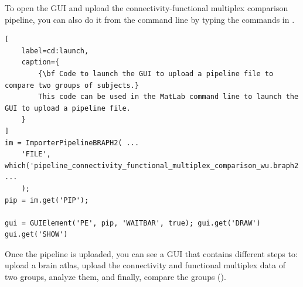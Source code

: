 \documentclass[justified]{tufte-handout}
\begin{document}
\begin{tcolorbox}[
	title=Pipeline launch from command line
]
To open the GUI and upload the connectivity-functional multiplex comparison pipeline, you can also do it from the command line by typing the commands in .
%
\begin{lstlisting}[
	label=cd:launch,
	caption={
		{\bf Code to launch the GUI to upload a pipeline file to compare two groups of subjects.}
		This code can be used in the MatLab command line to launch the GUI to upload a pipeline file.
	}
]
im = ImporterPipelineBRAPH2( ...
	'FILE', which('pipeline_connectivity_functional_multiplex_comparison_wu.braph2') ...
	);
pip = im.get('PIP');

gui = GUIElement('PE', pip, 'WAITBAR', true); gui.get('DRAW')
gui.get('SHOW')
\end{lstlisting}
\end{tcolorbox}

Once the pipeline is uploaded, you can see a GUI that contains different steps to: upload a brain atlas, upload the connectivity and functional multiplex data of two groups, analyze them, and finally, compare the groups (). 
\end{document}
